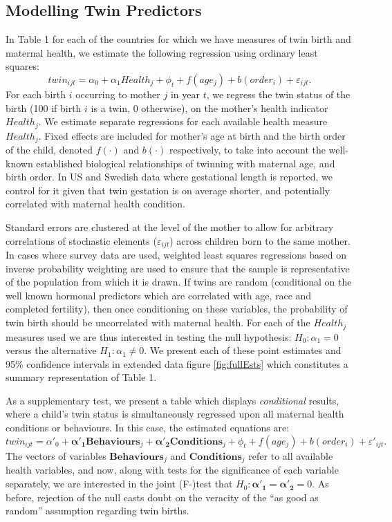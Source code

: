 \documentclass{nature}
\begin{document}
\begin{linenumbers}
\subsection{Modelling Twin Predictors}
In Table 1 for each of the countries for which we have measures of twin birth and maternal health, we estimate the following regression using ordinary least squares:
\begin{equation}
  twin_{ijt}=\alpha_0 + \alpha_1 Health_j + \phi_t + f(age_j) + b(order_i) + \varepsilon_{ijt}.
\end{equation}
For each birth $i$ occurring to mother $j$ in year $t$, we regress the twin status of the birth (100 if birth $i$ is a twin, 0 otherwise), on the mother's health indicator $Health_j$. We estimate separate regressions for each available health measure $Health_j$. Fixed effects are included for mother's age at birth and the birth order of the child, denoted $f(\cdot)$ and $b(\cdot)$ respectively, to take into account the well-known established biological relationships of twinning with maternal age, and birth order. In US and Swedish data where gestational length is reported, we control for it given that twin gestation is on average shorter, and potentially correlated with maternal health condition\cite{Morrison2005}.  

Standard errors are clustered at the level of the mother to allow for arbitrary correlations of stochastic elements ($\varepsilon_{ijt}$) across children born to the same mother. In cases where survey data are used, weighted least squares regressions based on inverse probability weighting are used to ensure that the sample is representative of the population from which it is drawn. If twins are random (conditional on the well known  hormonal predictors which are correlated with age, race and completed fertility\cite{Hall2003}), then once conditioning on these variables, the probability of twin birth should be uncorrelated with maternal health. For each of the $Health_j$ measures used we are thus interested in testing the null hypothesis: $H_0: \alpha_1=0$ versus the alternative $H_1: \alpha_1\neq0$.  We present each of these point estimates and 95\% confidence intervals in extended data figure \ref{fig:fullEsts} which constitutes a summary representation of Table 1. 

As a supplementary test, we present a table which displays \emph{conditional} results, where a child's twin status is simultaneously regressed upon all maternal health conditions or behaviours.  In this case, the estimated equations are:
\begin{equation}
  \label{reg:twincond}
  twin_{ijt}=\alpha'_0 + \bm{\alpha'_1} \bm{Behaviours}_j + \bm{\alpha'_2} \bm{Conditions}_j + \phi_t + f(age_j) + b(order_i) + \varepsilon'_{ijt}.
\end{equation}
The vectors of variables $\bm{Behaviours}_j$ and $\bm{Conditions}_j$ refer to all available health variables, and now, along with tests for the significance of each variable separately, we are interested in the joint (F-)test that $H_0:\bm{\alpha'_1}=\bm{\alpha'_2}=0$.  As before, rejection of the null casts doubt on the veracity of the ``as good as random'' assumption regarding twin births.



\end{linenumbers}
\end{document}
